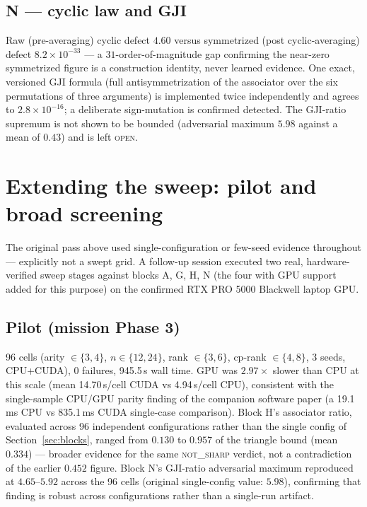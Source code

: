 \documentclass[11pt]{amsart}
\begin{document}
\subsection{N --- cyclic law and GJI}
Raw (pre-averaging) cyclic defect $4.60$ versus symmetrized (post
cyclic-averaging) defect $8.2\times10^{-33}$ --- a $31$-order-of-magnitude
gap confirming the near-zero symmetrized figure is a construction
identity, never learned evidence. One exact, versioned GJI formula (full
antisymmetrization of the associator over the six permutations of three
arguments) is implemented twice independently and agrees to
$2.8\times10^{-16}$; a deliberate sign-mutation is confirmed detected.
The GJI-ratio supremum is not shown to be bounded (adversarial maximum
$5.98$ against a mean of $0.43$) and is left \textsc{open}.

\section{Extending the sweep: pilot and broad screening}
\label{sec:sweep}

The original pass above used single-configuration or few-seed evidence
throughout --- explicitly not a swept grid. A follow-up session executed
two real, hardware-verified sweep stages against blocks A, G, H, N (the
four with GPU support added for this purpose) on the confirmed RTX PRO
5000 Blackwell laptop GPU.

\subsection{Pilot (mission Phase 3)}
96 cells (arity $\in\{3,4\}$, $n\in\{12,24\}$, rank $\in\{3,6\}$,
cp-rank $\in\{4,8\}$, 3 seeds, CPU+CUDA), 0 failures, 945.5\,s wall time.
GPU was $2.97\times$ slower than CPU at this scale (mean 14.70\,s/cell
CUDA vs 4.94\,s/cell CPU), consistent with the single-sample CPU/GPU
parity finding of the companion software paper (a 19.1\,ms CPU vs
835.1\,ms CUDA single-case comparison). Block H's
associator ratio, evaluated across 96 independent configurations rather
than the single config of Section~\ref{sec:blocks}, ranged from $0.130$
to $0.957$ of the triangle bound (mean $0.334$) --- broader evidence for
the same \textsc{not\_sharp} verdict, not a contradiction of the earlier
$0.452$ figure. Block N's GJI-ratio adversarial maximum reproduced at
$4.65$--$5.92$ across the 96 cells (original single-config value: $5.98$),
confirming that finding is robust across configurations rather than a
single-run artifact.
\end{document}
